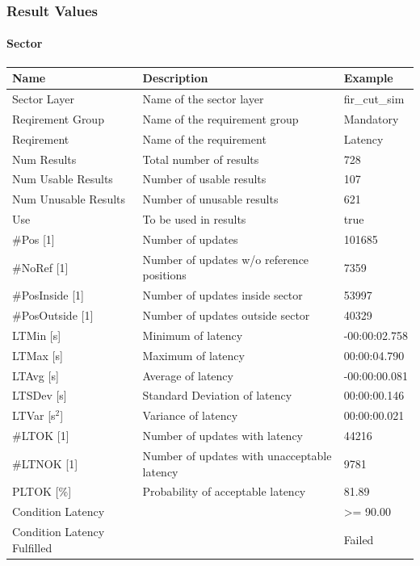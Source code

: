 \subsubsection{Result Values}

\paragraph{Sector}

\begin{center}
 \begin{table}[H]
  \begin{tabularx}{\textwidth}{ | l | X |  l | }
    \hline
    \textbf{Name} & \textbf{Description} & \textbf{Example} \\ \hline
    Sector Layer & Name of the sector layer & fir\_cut\_sim \\ \hline
    Reqirement Group & Name of the requirement group & Mandatory \\ \hline
    Reqirement & Name of the requirement & Latency \\ \hline
    Num Results & Total number of results & 728 \\ \hline
    Num Usable Results & Number of usable results & 107 \\ \hline
    Num Unusable Results & Number of unusable results & 621 \\ \hline
    Use & To be used in results & true \\ \hline
    \#Pos [1] & Number of updates & 101685 \\ \hline
    \#NoRef [1] & Number of updates w/o reference positions & 7359 \\ \hline
    \#PosInside [1] & Number of updates inside sector & 53997 \\ \hline
    \#PosOutside [1] & Number of updates outside sector & 40329 \\ \hline
    LTMin [s] & Minimum of latency & -00:00:02.758 \\ \hline
    LTMax [s] & Maximum of latency & 00:00:04.790 \\ \hline
    LTAvg [s] & Average of latency & -00:00:00.081 \\ \hline
    LTSDev [s] & Standard Deviation of latency & 00:00:00.146 \\ \hline
    LTVar [s$^2$] & Variance of latency & 00:00:00.021 \\ \hline
    \#LTOK [1] & Number of updates with latency & 44216 \\ \hline
    \#LTNOK [1] & Number of updates with unacceptable latency  & 9781 \\ \hline
    PLTOK [\%] & Probability of acceptable latency & 81.89 \\ \hline
    Condition Latency &  & >= 90.00 \\ \hline
    Condition Latency Fulfilled &  & Failed \\ \hline
\end{tabularx}
\end{table}
\end{center}

